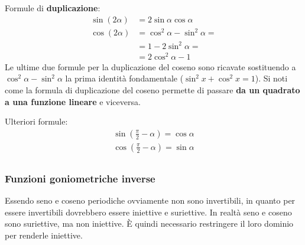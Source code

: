 Formule di \textbf{duplicazione}:\label{sec_formuleDuplicazione}
\begin{align*}
    \sin(2\alpha) &= 2\sin{\alpha}\cos{\alpha}\\
    \cos(2\alpha) &= \cos^2{\alpha} - \sin^2{\alpha} =\\
    &= 1 - 2\sin^2{\alpha} = \\
    &= 2\cos^2{\alpha} - 1
\end{align*}
Le ultime due formule per la duplicazione del coseno sono ricavate sostituendo 
a $\cos^2{\alpha} - \sin^2{\alpha}$ la prima identità fondamentale ($\sin^2{x} 
+ \cos^2{x} = 1$). Si noti come la formula di duplicazione del coseno permette 
di passare \textbf{da un quadrato a una funzione lineare} e viceversa.

Ulteriori formule:
\begin{gather*}
    \sin\left(\frac{\pi}{2}-\alpha\right) = \cos{\alpha}\\
    \cos\left(\frac{\pi}{2}-\alpha\right) = \sin{\alpha}\\
\end{gather*}

\subsubsection{Funzioni goniometriche inverse}

Essendo seno e coseno periodiche ovviamente non sono invertibili, in quanto per 
essere invertibili dovrebbero essere iniettive e suriettive. In realtà seno e 
coseno sono suriettive, ma non iniettive. È quindi necessario restringere il 
loro dominio per renderle iniettive.

